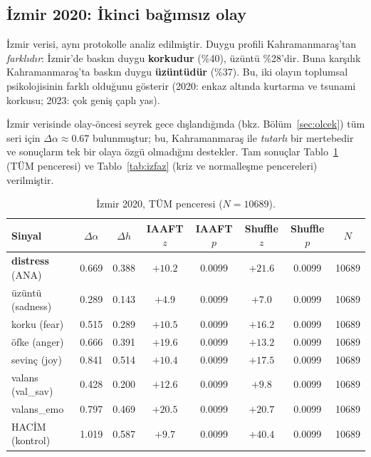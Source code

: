\documentclass[11pt,a4paper]{article}
\newcommand{\Dal}{\Delta\alpha}
\begin{document}
\subsection{İzmir 2020: İkinci bağımsız olay}

İzmir verisi, aynı protokolle analiz edilmiştir. Duygu profili
Kahramanmaraş'tan \emph{farklıdır}: İzmir'de baskın duygu \textbf{korkudur}
(\%40), üzüntü \%28'dir. Buna karşılık Kahramanmaraş'ta baskın duygu
\textbf{üzüntüdür} (\%37). Bu, iki olayın toplumsal psikolojisinin farklı
olduğunu gösterir (2020: enkaz altında kurtarma ve tsunami korkusu; 2023:
çok geniş çaplı yas).

İzmir verisinde olay-öncesi seyrek gece dışlandığında (bkz.
Bölüm~\ref{sec:olcek}) tüm seri için $\Dal \approx 0.67$ bulunmuştur; bu,
Kahramanmaraş ile \emph{tutarlı} bir mertebedir ve sonuçların tek bir olaya
özgü olmadığını destekler. Tam sonuçlar Tablo~\ref{tab:iz} (TÜM penceresi) ve
Tablo~\ref{tab:izfaz} (kriz ve normalleşme pencereleri) verilmiştir.

\begin{table}[H]
\centering
\small
\caption{İzmir 2020, TÜM penceresi ($N=10689$).}
\label{tab:iz}
\begin{tabular}{lccccccc}
\toprule
Sinyal & $\Dal$ & $\Delta h$ & IAAFT $z$ & IAAFT $p$ & Shuffle $z$ & Shuffle $p$ & $N$\\
\midrule
\textbf{distress} (ANA) & 0.669 & 0.388 & $+10.2$ & 0.0099 & $+21.6$ & 0.0099 & 10689\\
üzüntü (sadness)      & 0.289 & 0.143 & $+4.9$  & 0.0099 & $+7.0$  & 0.0099 & 10689\\
korku (fear)           & 0.515 & 0.289 & $+10.5$ & 0.0099 & $+16.2$ & 0.0099 & 10689\\
öfke (anger)           & 0.666 & 0.391 & $+19.6$ & 0.0099 & $+13.2$ & 0.0099 & 10689\\
sevinç (joy)           & 0.841 & 0.514 & $+10.4$ & 0.0099 & $+17.5$ & 0.0099 & 10689\\
valans (val\_sav)      & 0.428 & 0.200 & $+12.6$ & 0.0099 & $+9.8$  & 0.0099 & 10689\\
valans\_emo            & 0.797 & 0.469 & $+20.5$ & 0.0099 & $+20.7$ & 0.0099 & 10689\\
\midrule
HACİM (kontrol)        & 1.019 & 0.587 & $+9.7$  & 0.0099 & $+40.4$ & 0.0099 & 10689\\
\bottomrule
\end{tabular}
\end{table}
\end{document}
